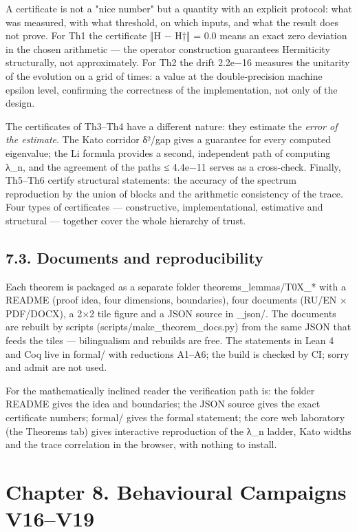 \documentclass[11pt,a4paper]{article}
\begin{document}
A certificate is not a "nice number" but a quantity with an explicit protocol: what was measured, with what threshold, on which inputs, and what the result does not prove. For Th1 the certificate ‖H − H†‖ = 0.0 means an exact zero deviation in the chosen arithmetic — the operator construction guarantees Hermiticity structurally, not approximately. For Th2 the drift 2.2e−16 measures the unitarity of the evolution on a grid of times: a value at the double-precision machine epsilon level, confirming the correctness of the implementation, not only of the design.

The certificates of Th3–Th4 have a different nature: they estimate the \emph{error of the estimate}. The Kato corridor δ²/gap gives a guarantee for every computed eigenvalue; the Li formula provides a second, independent path of computing λ\_n, and the agreement of the paths ≤ 4.4e−11 serves as a cross-check. Finally, Th5–Th6 certify structural statements: the accuracy of the spectrum reproduction by the union of blocks and the arithmetic consistency of the trace. Four types of certificates — constructive, implementational, estimative and structural — together cover the whole hierarchy of trust.

\subsection{7.3. Documents and reproducibility}

Each theorem is packaged as a separate folder theorems\_lemmas/T0X\_* with a README (proof idea, four dimensions, boundaries), four documents (RU/EN × PDF/DOCX), a 2×2 tile figure and a JSON source in \_json/. The documents are rebuilt by scripts (scripts/make\_theorem\_docs.py) from the same JSON that feeds the tiles — bilingualism and rebuilds are free. The statements in Lean 4 and Coq live in formal/ with reductions A1–A6; the build is checked by CI; sorry and admit are not used.

For the mathematically inclined reader the verification path is: the folder README gives the idea and boundaries; the JSON source gives the exact certificate numbers; formal/ gives the formal statement; the core web laboratory (the Theorems tab) gives interactive reproduction of the λ\_n ladder, Kato widths and the trace correlation in the browser, with nothing to install.

\section{Chapter 8. Behavioural Campaigns V16–V19}
\end{document}
